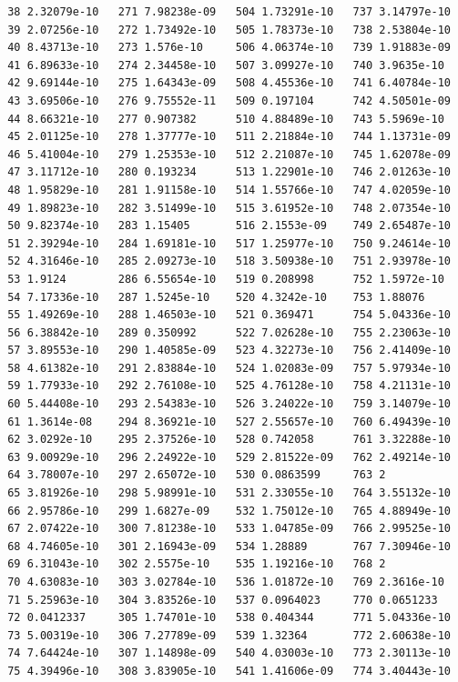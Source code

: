 \documentclass{article}
\begin{document}
\begin{verbatim}
 38 2.32079e-10   271 7.98238e-09   504 1.73291e-10   737 3.14797e-10
 39 2.07256e-10   272 1.73492e-10   505 1.78373e-10   738 2.53804e-10
 40 8.43713e-10   273 1.576e-10     506 4.06374e-10   739 1.91883e-09
 41 6.89633e-10   274 2.34458e-10   507 3.09927e-10   740 3.9635e-10
 42 9.69144e-10   275 1.64343e-09   508 4.45536e-10   741 6.40784e-10
 43 3.69506e-10   276 9.75552e-11   509 0.197104      742 4.50501e-09
 44 8.66321e-10   277 0.907382      510 4.88489e-10   743 5.5969e-10
 45 2.01125e-10   278 1.37777e-10   511 2.21884e-10   744 1.13731e-09
 46 5.41004e-10   279 1.25353e-10   512 2.21087e-10   745 1.62078e-09
 47 3.11712e-10   280 0.193234      513 1.22901e-10   746 2.01263e-10
 48 1.95829e-10   281 1.91158e-10   514 1.55766e-10   747 4.02059e-10
 49 1.89823e-10   282 3.51499e-10   515 3.61952e-10   748 2.07354e-10
 50 9.82374e-10   283 1.15405       516 2.1553e-09    749 2.65487e-10
 51 2.39294e-10   284 1.69181e-10   517 1.25977e-10   750 9.24614e-10
 52 4.31646e-10   285 2.09273e-10   518 3.50938e-10   751 2.93978e-10
 53 1.9124        286 6.55654e-10   519 0.208998      752 1.5972e-10
 54 7.17336e-10   287 1.5245e-10    520 4.3242e-10    753 1.88076
 55 1.49269e-10   288 1.46503e-10   521 0.369471      754 5.04336e-10
 56 6.38842e-10   289 0.350992      522 7.02628e-10   755 2.23063e-10
 57 3.89553e-10   290 1.40585e-09   523 4.32273e-10   756 2.41409e-10
 58 4.61382e-10   291 2.83884e-10   524 1.02083e-09   757 5.97934e-10
 59 1.77933e-10   292 2.76108e-10   525 4.76128e-10   758 4.21131e-10
 60 5.44408e-10   293 2.54383e-10   526 3.24022e-10   759 3.14079e-10
 61 1.3614e-08    294 8.36921e-10   527 2.55657e-10   760 6.49439e-10
 62 3.0292e-10    295 2.37526e-10   528 0.742058      761 3.32288e-10
 63 9.00929e-10   296 2.24922e-10   529 2.81522e-09   762 2.49214e-10
 64 3.78007e-10   297 2.65072e-10   530 0.0863599     763 2
 65 3.81926e-10   298 5.98991e-10   531 2.33055e-10   764 3.55132e-10
 66 2.95786e-10   299 1.6827e-09    532 1.75012e-10   765 4.88949e-10
 67 2.07422e-10   300 7.81238e-10   533 1.04785e-09   766 2.99525e-10
 68 4.74605e-10   301 2.16943e-09   534 1.28889       767 7.30946e-10
 69 6.31043e-10   302 2.5575e-10    535 1.19216e-10   768 2
 70 4.63083e-10   303 3.02784e-10   536 1.01872e-10   769 2.3616e-10
 71 5.25963e-10   304 3.83526e-10   537 0.0964023     770 0.0651233
 72 0.0412337     305 1.74701e-10   538 0.404344      771 5.04336e-10
 73 5.00319e-10   306 7.27789e-09   539 1.32364       772 2.60638e-10
 74 7.64424e-10   307 1.14898e-09   540 4.03003e-10   773 2.30113e-10
 75 4.39496e-10   308 3.83905e-10   541 1.41606e-09   774 3.40443e-10

\end{verbatim}
\end{document}
